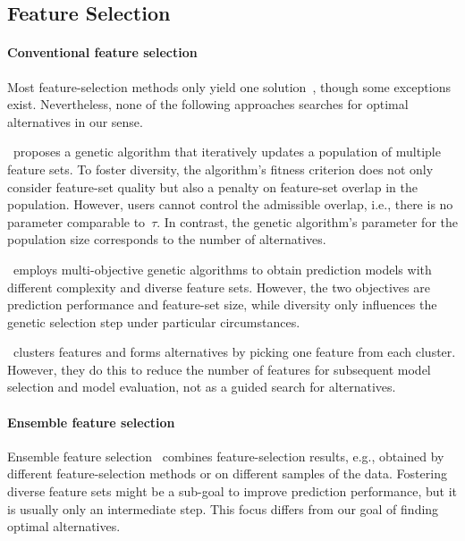\documentclass{article}
\theoremstyle{definition}
\begin{document}
\subsection{Feature Selection}
\label{sec:afs:related-work:feature-selection}

\paragraph{Conventional feature selection}

Most feature-selection methods only yield one solution~\cite{borboudakis2021extending}, though some exceptions exist.
Nevertheless, none of the following approaches searches for optimal alternatives in our sense.

\cite{siddiqi2020genetic}~proposes a genetic algorithm that iteratively updates a population of multiple feature sets.
To foster diversity, the algorithm's fitness criterion does not only consider feature-set quality but also a penalty on feature-set overlap in the population.
However, users cannot control the admissible overlap, i.e., there is no parameter comparable to~$\tau$.
In contrast, the genetic algorithm's parameter for the population size corresponds to the number of alternatives.

\cite{emmanouilidis1999selecting}~employs multi-objective genetic algorithms to obtain prediction models with different complexity and diverse feature sets.
However, the two objectives are prediction performance and feature-set size, while diversity only influences the genetic selection step under particular circumstances.

\cite{mueller2021feature}~clusters features and forms alternatives by picking one feature from each cluster.
However, they do this to reduce the number of features for subsequent model selection and model evaluation, not as a guided search for alternatives.

\paragraph{Ensemble feature selection}

Ensemble feature selection~\cite{saeys2008robust, seijo2017ensemble} combines feature-selection results, e.g., obtained by different feature-selection methods or on different samples of the data.
Fostering diverse feature sets might be a sub-goal to improve prediction performance, but it is usually only an intermediate step.
This focus differs from our goal of finding optimal alternatives.
\end{document}
